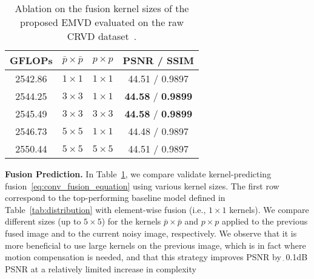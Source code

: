 \documentclass[final]{cvpr}
\newcommand{\textapprox}{$_{\widetilde{~}}$}
\begin{document}
    \begin{table}[t]
        \centering
        \small
\vspace{-0.2cm}
        \begin{tabular}{cccc}
            \hline
            GFLOPs  & $\bar{p} \times \bar{p}$ & $p \times p$ & PSNR / SSIM   \\
            \hline \hline
            2542.86 & $1\times1$ & $1\times1$ & 44.51 / 0.9897   \\
            2544.25 & $3\times3$ & $1\times1$ & \textbf{44.58} / \textbf{0.9899}   \\
            2545.49 & $3\times3$ & $3\times3$ & \textbf{44.58} / \textbf{0.9899}   \\
            2546.73 & $5\times5$ & $1\times1$ & 44.48 / 0.9897   \\
            2550.44 & $5\times5$ & $5\times5$ & 44.51 / 0.9897   \\
            \hline
        \end{tabular}
        \vspace{-0.1cm}
        \caption{Ablation on the fusion kernel sizes of the proposed EMVD evaluated on the raw CRVD dataset~\cite{yue2020supervised}.}
        \label{tab:kpn_fusion}
        \vspace{-0.3cm}
    \end{table}

    \textbf{Fusion Prediction.} In Table~\ref{tab:kpn_fusion}, we compare validate kernel-predicting fusion~\eqref{eq:conv_fusion_equation} using various kernel sizes. The first row correspond to the top-performing baseline model defined in Table~\ref{tab:distribution} with element-wise fusion (i.e., $1\times1$ kernels). We compare different sizes (up to $5\times5$) for the kernels $\bar{p} \times \bar{p}$ and $p \times p$ applied to the previous fused image and to the current noisy image, respectively. We observe that it is more beneficial to use large kernels on the previous image, which is in fact where motion compensation is needed, and that this strategy improves PSNR by \textapprox0.1dB PSNR at a relatively limited increase in complexity
\end{document}
